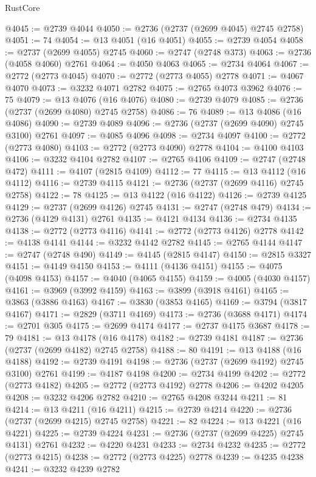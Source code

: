 \begin{lexlean}{RustCore}
\begin{coremodule}
@4045 := @2739 @4044
@4050 := @2736 (@2737 (@2699 @4045) @2745 @2758)
@4051 := 74
@4054 := @13 @4051 (@16 @4051)
@4055 := @2739 @4054
@4058 := @2737 (@2699 @4055) @2745
@4060 := @2747 (@2748 @373)
@4063 := @2736 (@4058 @4060) @2761
@4064 := @4050 @4063
@4065 := @2734 @4064
@4067 := @2772 (@2773 @4045)
@4070 := @2772 (@2773 @4055) @2778
@4071 := @4067 @4070
@4073 := @3232 @4071 @2782
@4075 := @2765 @4073 @3962
@4076 := 75
@4079 := @13 @4076 (@16 @4076)
@4080 := @2739 @4079
@4085 := @2736 (@2737 (@2699 @4080) @2745 @2758)
@4086 := 76
@4089 := @13 @4086 (@16 @4086)
@4090 := @2739 @4089
@4096 := @2736 (@2737 (@2699 @4090) @2745 @3100) @2761
@4097 := @4085 @4096
@4098 := @2734 @4097
@4100 := @2772 (@2773 @4080)
@4103 := @2772 (@2773 @4090) @2778
@4104 := @4100 @4103
@4106 := @3232 @4104 @2782
@4107 := @2765 @4106
@4109 := @2747 (@2748 @472)
@4111 := @4107 (@2815 @4109)
@4112 := 77
@4115 := @13 @4112 (@16 @4112)
@4116 := @2739 @4115
@4121 := @2736 (@2737 (@2699 @4116) @2745 @2758)
@4122 := 78
@4125 := @13 @4122 (@16 @4122)
@4126 := @2739 @4125
@4129 := @2737 (@2699 @4126) @2745
@4131 := @2747 (@2748 @479)
@4134 := @2736 (@4129 @4131) @2761
@4135 := @4121 @4134
@4136 := @2734 @4135
@4138 := @2772 (@2773 @4116)
@4141 := @2772 (@2773 @4126) @2778
@4142 := @4138 @4141
@4144 := @3232 @4142 @2782
@4145 := @2765 @4144
@4147 := @2747 (@2748 @490)
@4149 := @4145 (@2815 @4147)
@4150 := @2815 @3327
@4151 := @4149 @4150
@4153 := @4111 (@4136 @4151)
@4155 := @4075 (@4098 @4153)
@4157 := @4040 (@4065 @4155)
@4159 := @4005 (@4030 @4157)
@4161 := @3969 (@3992 @4159)
@4163 := @3899 (@3918 @4161)
@4165 := @3863 (@3886 @4163)
@4167 := @3830 (@3853 @4165)
@4169 := @3794 (@3817 @4167)
@4171 := @2829 (@3711 @4169)
@4173 := @2736 (@3688 @4171)
@4174 := @2701 @305
@4175 := @2699 @4174
@4177 := @2737 @4175 @3687
@4178 := 79
@4181 := @13 @4178 (@16 @4178)
@4182 := @2739 @4181
@4187 := @2736 (@2737 (@2699 @4182) @2745 @2758)
@4188 := 80
@4191 := @13 @4188 (@16 @4188)
@4192 := @2739 @4191
@4198 := @2736 (@2737 (@2699 @4192) @2745 @3100) @2761
@4199 := @4187 @4198
@4200 := @2734 @4199
@4202 := @2772 (@2773 @4182)
@4205 := @2772 (@2773 @4192) @2778
@4206 := @4202 @4205
@4208 := @3232 @4206 @2782
@4210 := @2765 @4208 @3244
@4211 := 81
@4214 := @13 @4211 (@16 @4211)
@4215 := @2739 @4214
@4220 := @2736 (@2737 (@2699 @4215) @2745 @2758)
@4221 := 82
@4224 := @13 @4221 (@16 @4221)
@4225 := @2739 @4224
@4231 := @2736 (@2737 (@2699 @4225) @2745 @4131) @2761
@4232 := @4220 @4231
@4233 := @2734 @4232
@4235 := @2772 (@2773 @4215)
@4238 := @2772 (@2773 @4225) @2778
@4239 := @4235 @4238
@4241 := @3232 @4239 @2782

\end{coremodule}
\end{lexlean}
